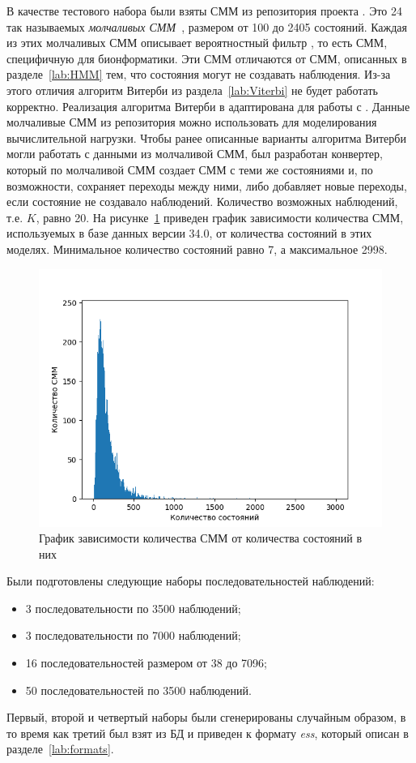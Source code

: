 В качестве тестового набора были взяты СММ из репозитория  
проекта .
Это 24 так называемых \emph{молчаливых СММ}~\cite{silentHMM}, 
размером от 100 до 2405 состояний.
Каждая из этих молчаливых СММ описывает вероятностный фильтр , то есть СММ, специфичную для бионформатики.
Эти СММ отличаются от СММ, описанных в разделе~\ref{lab:HMM} 
тем, что состояния могут не создавать наблюдения.
Из-за этого отличия алгоритм Витерби из 
раздела~\ref{lab:Viterbi} не будет работать корректно.
Реализация алгоритма Витерби в  адаптирована для работы с .
Данные молчаливые СММ из репозитория  можно использовать 
для моделирования вычислительной нагрузки.
Чтобы ранее описанные варианты алгоритма Витерби могли 
работать с данными из молчаливой СММ, был разработан 
конвертер, который по молчаливой СММ создает СММ с теми же 
состояниями и, по возможности, сохраняет переходы между ними, 
либо добавляет новые переходы, если состояние не создавало 
наблюдений.
Количество возможных наблюдений, т.е. $K$, равно 20.
На рисунке~\ref{HMM_mean} приведен график зависимости количества СММ, используемых в базе данных  версии 34.0, от количества состояний в этих моделях.
Минимальное количество состояний равно 7, а максимальное 2998.
\begin{figure}[h!]
  \centering
  \includegraphics[width=\columnwidth]{mean_HMM.png}
  \caption{График зависимости количества СММ от количества состояний в них}
  \label{HMM_mean}
\end{figure}

Были подготовлены следующие наборы последовательностей наблюдений:
\begin{itemize}
	\item 3 последовательности по 3500 наблюдений;
	\item 3 последовательности по 7000 наблюдений;
	\item 16 последовательностей размером от 38 до 7096;
	\item 50 последовательностей по 3500 наблюдений.
\end{itemize}
Первый, второй и четвертый наборы были сгенерированы случайным образом, в то время 
как третий был взят из БД  и 
приведен к формату \emph{ess}, который описан в 
разделе~\ref{lab:formats}.


